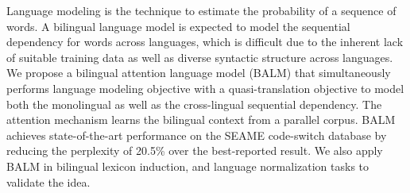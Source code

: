 Language modeling is the technique to estimate the probability of a sequence of words. A bilingual language model is expected to model the sequential dependency for words across languages, which is difficult due to the inherent lack of suitable training data as well as diverse syntactic structure across languages. We propose a bilingual attention language model (BALM) that simultaneously performs language modeling objective with a quasi-translation objective to model both the monolingual as well as the cross-lingual sequential dependency. The attention mechanism learns the bilingual context from a parallel corpus. BALM achieves state-of-the-art performance on the SEAME code-switch database by reducing the perplexity of 20.5\% over the best-reported result. We also apply BALM in bilingual lexicon induction, and language normalization tasks to validate the idea.
